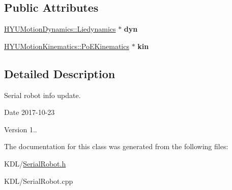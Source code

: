 \subsection*{Public Attributes}
\begin{DoxyCompactItemize}
\item 
\mbox{\label{classrobot_a31d1beabf077c87e163c6071254811b0}} 
\hyperlink{class_h_y_u_motion_dynamics_1_1_liedynamics}{H\+Y\+U\+Motion\+Dynamics\+::\+Liedynamics} $\ast$ {\bfseries dyn}
\item 
\mbox{\label{classrobot_ac1d6d63d56a5a96b13fb2c36e202bc00}} 
\hyperlink{class_h_y_u_motion_kinematics_1_1_po_e_kinematics}{H\+Y\+U\+Motion\+Kinematics\+::\+Po\+E\+Kinematics} $\ast$ {\bfseries kin}
\end{DoxyCompactItemize}


\subsection{Detailed Description}
Serial robot info update. 

\begin{DoxyDate}{Date}
2017-\/10-\/23 
\end{DoxyDate}
\begin{DoxyVersion}{Version}
1.. 
\end{DoxyVersion}


The documentation for this class was generated from the following files\+:\begin{DoxyCompactItemize}
\item 
K\+D\+L/\hyperlink{_serial_robot_8h}{Serial\+Robot.\+h}\item 
K\+D\+L/Serial\+Robot.\+cpp\end{DoxyCompactItemize}
